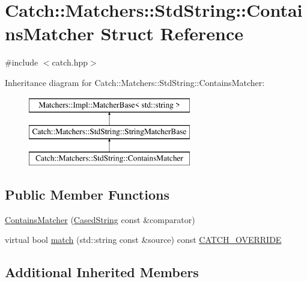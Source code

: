 \hypertarget{structCatch_1_1Matchers_1_1StdString_1_1ContainsMatcher}{\section{Catch\-:\-:Matchers\-:\-:Std\-String\-:\-:Contains\-Matcher Struct Reference}
\label{structCatch_1_1Matchers_1_1StdString_1_1ContainsMatcher}
}


{\ttfamily \#include $<$catch.\-hpp$>$}

Inheritance diagram for Catch\-:\-:Matchers\-:\-:Std\-String\-:\-:Contains\-Matcher\-:\begin{figure}[H]
\begin{center}
\leavevmode
\includegraphics[height=3.000000cm]{structCatch_1_1Matchers_1_1StdString_1_1ContainsMatcher}
\end{center}
\end{figure}
\subsection*{Public Member Functions}
\begin{DoxyCompactItemize}
\item 
\hyperlink{structCatch_1_1Matchers_1_1StdString_1_1ContainsMatcher_acc892883c8409e34b28c9b39d4ef1fe3}{Contains\-Matcher} (\hyperlink{structCatch_1_1Matchers_1_1StdString_1_1CasedString}{Cased\-String} const \&comparator)
\item 
virtual bool \hyperlink{structCatch_1_1Matchers_1_1StdString_1_1ContainsMatcher_ae4d567347fa563e365f1044f29ab1042}{match} (std\-::string const \&source) const \hyperlink{catch_8hpp_a8ecdce4d3f57835f707915ae831eb847}{C\-A\-T\-C\-H\-\_\-\-O\-V\-E\-R\-R\-I\-D\-E}
\end{DoxyCompactItemize}
\subsection*{Additional Inherited Members}


